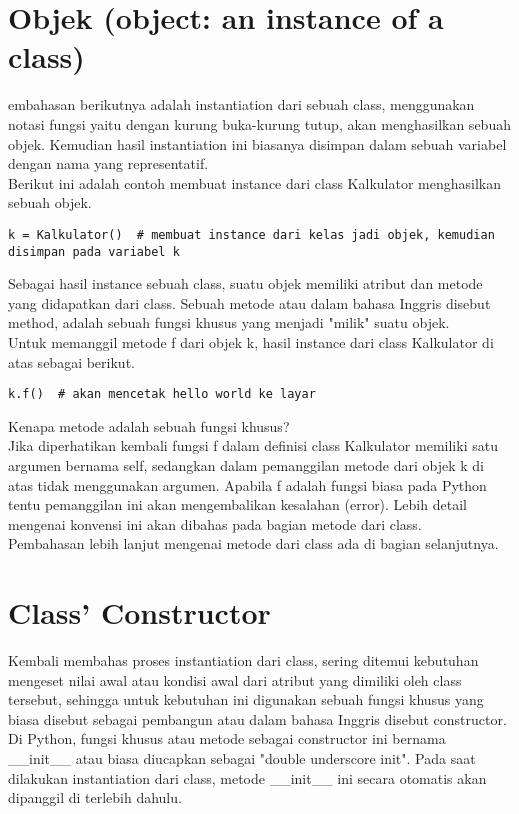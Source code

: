 \section{Objek (object: an instance of a class)}

embahasan berikutnya adalah instantiation dari sebuah class, menggunakan notasi fungsi yaitu dengan kurung buka-kurung tutup, akan menghasilkan sebuah objek. Kemudian hasil instantiation ini biasanya disimpan dalam sebuah variabel dengan nama yang representatif.\\

Berikut ini adalah contoh membuat instance dari class Kalkulator menghasilkan sebuah objek.
\begin{verbatim}
k = Kalkulator()  # membuat instance dari kelas jadi objek, kemudian disimpan pada variabel k
\end{verbatim}

Sebagai hasil instance sebuah class, suatu objek memiliki atribut dan metode yang didapatkan dari class. Sebuah metode atau dalam bahasa Inggris disebut method, adalah sebuah fungsi khusus yang menjadi "milik" suatu objek.\\

Untuk memanggil metode f dari objek k, hasil instance dari class Kalkulator di atas sebagai berikut.
\begin{verbatim}
k.f()  # akan mencetak hello world ke layar
\end{verbatim}

Kenapa metode adalah sebuah fungsi khusus?\\
Jika diperhatikan kembali fungsi f dalam definisi class Kalkulator memiliki satu argumen bernama self, sedangkan dalam pemanggilan metode dari objek k di atas tidak menggunakan argumen. Apabila f adalah fungsi biasa pada Python tentu pemanggilan ini akan mengembalikan kesalahan (error). Lebih detail mengenai konvensi ini akan dibahas pada bagian metode dari class.\\

Pembahasan lebih lanjut mengenai metode dari class ada di bagian selanjutnya.\\

\section{Class’ Constructor}

Kembali membahas proses instantiation dari class, sering ditemui kebutuhan mengeset nilai awal atau kondisi awal dari atribut yang dimiliki oleh class tersebut, sehingga untuk kebutuhan ini digunakan sebuah fungsi khusus yang biasa disebut sebagai pembangun atau dalam bahasa Inggris disebut constructor. Di Python, fungsi khusus atau metode sebagai constructor ini bernama \_\_init\_\_ atau biasa diucapkan sebagai "double underscore init". Pada saat dilakukan instantiation dari class, metode \_\_init\_\_ ini secara otomatis akan dipanggil di terlebih dahulu.\\


